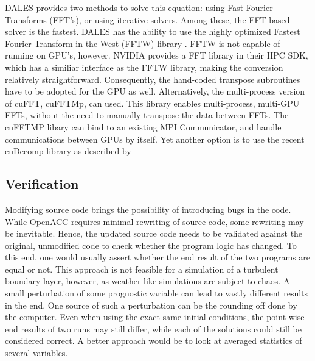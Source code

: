  DALES provides two methods to solve this equation: using Fast Fourier Transforms (FFT's), or using iterative solvers. Among these, the FFT-based solver is the fastest. DALES has the ability to use the highly optimized Fastest Fourier Transform in the West (FFTW) library \citep{FFTW97}. FFTW is not capable of running on GPU's, however. NVIDIA provides a FFT library in their HPC SDK, which has a similiar interface as the FFTW library, making the conversion relatively straightforward. Consequently, the hand-coded transpose subroutines have to be adopted for the GPU as well. Alternatively, the multi-process version of cuFFT, cuFFTMp, can used. This library enables multi-process, multi-GPU FFTs, without the need to manually transpose the data between FFTs. The cuFFTMP libary can bind to an existing MPI Communicator, and handle communications between GPUs by itself. Yet another option is to use the recent cuDecomp library as described by 

\subsection{Verification}
Modifying source code brings the possibility of introducing bugs in the code. While OpenACC requires minimal rewriting of source code, some rewriting may be inevitable. Hence, the updated source code needs to be validated against the original, unmodified code to check whether the program logic has changed. To this end, one would usually assert whether the end result of the two programs are equal or not. This approach is not feasible for a simulation of a turbulent boundary layer, however, as weather-like simulations are subject to chaos. A small perturbation of some prognostic variable can lead to vastly different results in the end. One source of such a perturbation can be the rounding off done by the computer. Even when using the exact same initial conditions, the point-wise end results of two runs may still differ, while each of the solutions could still be considered correct. A better approach would be to look at averaged statistics of several variables. 

